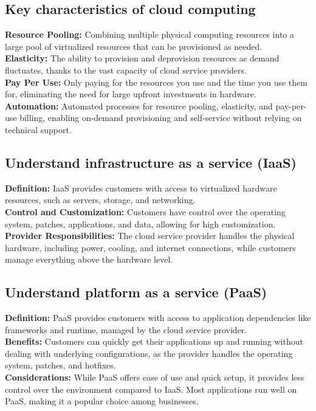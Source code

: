 \documentclass[12pt]{article}
\begin{document}
\subsection{Key characteristics of cloud computing}
\textbf{Resource Pooling:}  Combining multiple physical computing resources into a large pool of virtualized resources that can be provisioned as needed.\\
\textbf{Elasticity:}  The ability to provision and deprovision resources as demand fluctuates, thanks to the vast capacity of cloud service providers.\\
\textbf{Pay Per Use:}  Only paying for the resources you use and the time you use them for, eliminating the need for large upfront investments in hardware.\\
\textbf{Automation:}  Automated processes for resource pooling, elasticity, and pay-per-use billing, enabling on-demand provisioning and self-service without relying on technical support.

\subsection{Understand infrastructure as a service (IaaS)}
\textbf{Definition:}  IaaS provides customers with access to virtualized hardware resources, such as servers, storage, and networking.\\
\textbf{Control and Customization:}  Customers have control over the operating system, patches, applications, and data, allowing for high customization.\\
\textbf{Provider Responsibilities:}  The cloud service provider handles the physical hardware, including power, cooling, and internet connections, while customers manage everything above the hardware level.

\subsection{Understand platform as a service (PaaS)}
\textbf{Definition:}  PaaS provides customers with access to application dependencies like frameworks and runtime, managed by the cloud service provider.\\
\textbf{Benefits:}  Customers can quickly get their applications up and running without dealing with underlying configurations, as the provider handles the operating system, patches, and hotfixes.\\
\textbf{Considerations:}  While PaaS offers ease of use and quick setup, it provides less control over the environment compared to IaaS. Most applications run well on PaaS, making it a popular choice among businesses.
\end{document}
